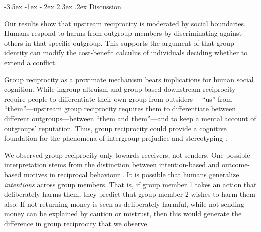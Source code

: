 \documentclass[12pt,a4paper]{article}\usepackage[]{graphicx}\usepackage[]{color}
\makeatletter
\renewcommand\section{\@startsection {section}{1}{\z@}%
{-3.5ex \@plus -1ex \@minus -.2ex}%
{2.3ex \@plus.2ex}%
{\bf\sffamily\Large}}
\makeatother
\begin{document}
\section{Discussion}
\label{sec:conclusion}

Our results show that upstream reciprocity is moderated by social boundaries. 
Humans respond to harms from outgroup members by discriminating against others 
in that specific outgroup. This supports the argument of \citet{Pietraszewski2016470} that group identity can modify the cost-benefit calculus of individuals deciding whether to extend a conflict. 


% 

% 


Group reciprocity as a proximate mechanism bears implications for human social cognition. While ingroup altruism and group-based downstream reciprocity require people to differentiate their own group from outsiders ---``us'' from ``them''---upstream group  reciprocity requires them to differentiate between different outgroups---between ``them and them''---and to keep a mental account of outgroups' reputation. Thus, group reciprocity could provide a cognitive foundation for the phenomena of intergroup prejudice and stereotyping \citep{allport1954nature}.

We observed group reciprocity only towards receivers, not senders. One possible interpretation stems from the distinction
between intention-based
and outcome-based motives in reciprocal behaviour \citep{falk2006theory}. It is possible that humans
generalize \emph{intentions} across group members. That is, if group member 1 takes an action that deliberately harms them,
they predict that group member 2 wishes to harm them also. If not returning money is seen as deliberately harmful, while
not sending money can be explained by caution or mistrust, then this would generate the difference in group reciprocity
that we observe.
\end{document}
